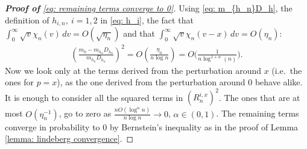 \begin{proof}[\hypertarget{proof of lemma 9}{\textbf{Proof of}} \eqref{eq: remaining terms converge to 0}]
Using \eqref{eq: m_{h_n}D_h}, the definition of $h_{i,n}, \: i=1,2$ in \eqref{eq: h_i},  the fact that $\int_{0}^{\infty} \sqrt{v} \chi_n (v) \, dv = O(\sqrt{\eta_n})$ and that
$\int_{0}^{\infty} \sqrt{v} \chi_n (v-x) \, dv = O(\eta_n)$:
\begin{align*}
   \left( \frac{m_0 - m_{h_n} D_{h_n}}{m_{h_n} D_{h_n}} \right)^2 = O\left( \frac{\eta_n}{n \log{n} }\right) = O\bigg(\frac{1}{n \log^{1+\alpha}{(n)}} \bigg). 
\end{align*}
Now we look only at the terms derived from the perturbation around $x$ (i.e.\ the ones for $p= x$), as the one derived from the perturbation around $0$ behave alike. It is enough to consider all the squared terms in $(R^{i,x}_n)^2$. The ones that are at most $O(\eta_n^{-1})$, go to zero as $\frac{n  O(\log^{\alpha}{n})}{n\log{n}}  \rightarrow 0 $, $\alpha \in (0,1)$. The remaining terms converge in probability to 0 by Bernstein's inequality as in the proof of Lemma \ref{lemma: lindeberg convergence}.
\end{proof}

